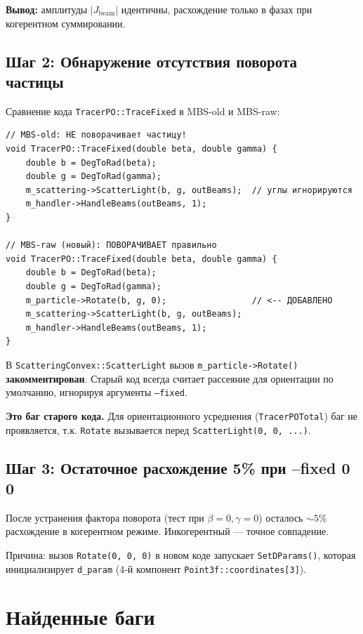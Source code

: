\documentclass[a4paper,11pt]{article}
\begin{document}
\textbf{Вывод:} амплитуды $|J_\text{beam}|$ идентичны, расхождение только в фазах
при когерентном суммировании.

\subsection{Шаг 2: Обнаружение отсутствия поворота частицы}

Сравнение кода \texttt{TracerPO::TraceFixed} в MBS-old и MBS-raw:

\begin{lstlisting}
// MBS-old: НЕ поворачивает частицу!
void TracerPO::TraceFixed(double beta, double gamma) {
    double b = DegToRad(beta);
    double g = DegToRad(gamma);
    m_scattering->ScatterLight(b, g, outBeams);  // углы игнорируются
    m_handler->HandleBeams(outBeams, 1);
}

// MBS-raw (новый): ПОВОРАЧИВАЕТ правильно
void TracerPO::TraceFixed(double beta, double gamma) {
    double b = DegToRad(beta);
    double g = DegToRad(gamma);
    m_particle->Rotate(b, g, 0);                 // <-- ДОБАВЛЕНО
    m_scattering->ScatterLight(b, g, outBeams);
    m_handler->HandleBeams(outBeams, 1);
}
\end{lstlisting}

В \texttt{ScatteringConvex::ScatterLight} вызов \texttt{m\_particle->Rotate()}
\textbf{закомментирован}. Старый код всегда считает рассеяние для ориентации по
умолчанию, игнорируя аргументы \texttt{--fixed}.

\textbf{Это баг старого кода.} Для ориентационного усреднения
(\texttt{TracerPOTotal}) баг не проявляется, т.к. \texttt{Rotate} вызывается
перед \texttt{ScatterLight(0, 0, ...)}.

\subsection{Шаг 3: Остаточное расхождение 5\% при --fixed 0 0}

После устранения фактора поворота (тест при $\beta=0, \gamma=0$) осталось
$\sim 5\%$ расхождение в когерентном режиме. Инкогерентный --- точное совпадение.

Причина: вызов \texttt{Rotate(0, 0, 0)} в новом коде запускает
\texttt{SetDParams()}, которая инициализирует \texttt{d\_param} (4-й компонент
\texttt{Point3f::coordinates[3]}).

\section{Найденные баги}
\end{document}
